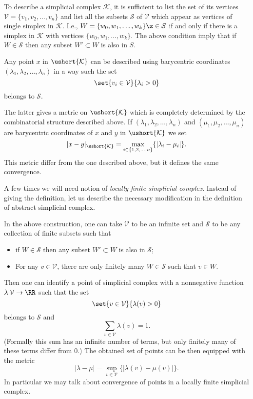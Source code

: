 To describe a simplicial complex $\mathcal{K}$, it is sufficient to list the set of its vertices 
$\mathcal{V}=\{v_1,v_2,\dots,v_n\}$ and list all the subsets $\mathcal{S}$ of $\mathcal{V}$ which appear as vertices of single simplex in $\mathcal{K}$.
I.e., $W=\{w_0,w_1,\dots,w_k\}\z\in \mathcal{S}$ if and only if 
there is a simplex in $\mathcal{K}$ with vertices $\{w_0,w_1,\dots,w_k\}$.
The above condition imply that if $W\in \mathcal{S}$ then any subset $W'\subset W$ is also in $S$.

Any point $x$ in $\ushort{\mathcal{K}}$ can be described using barycentric coordinates 
$(\lambda_1,\lambda_2,\dots,\lambda_n)$ in a way such the set 
$$\set{v_i\in\mathcal{V}}{\lambda_i>0}$$
belongs to $\mathcal{S}$.

The latter gives a metric on $\ushort{\mathcal{K}}$ which is completely determined by the combinatorial structure described above.
If $(\lambda_1,\lambda_2,\dots,\lambda_n)$ and $(\mu_1,\mu_2,\dots,\mu_n)$
are barycentric coordinates of $x$ and $y$ in $\ushort{\mathcal{K}}$ we set
$$|x-y|_{\ushort{\mathcal{K}}}=\max_{i\in\{1,2,\dots,n\}}\{|\lambda_i-\mu_i|\}.$$
This metric differ from the one described above, but it defines the same convergence.



A few times we will need notion of \emph{locally finite simplicial complex}.
Instead of giving the definition, let us describe the necessary modification in the definition of abstract simplicial complex.

In the above construction, one can take $\mathcal{V}$ to be an infinite set and 
$\mathcal{S}$ to be any collection of finite subsets such that
\begin{itemize}
\item if $W\in \mathcal{S}$ then any subset $W'\subset W$ is also in $\mathcal{S}$;
\item For any $v\in \mathcal{V}$, there are only finitely many $W \in \mathcal{S}$ such that $v \in W$.
\end{itemize}
Then one can identify a point of simplicial complex with a nonnegative function
$\lambda\:\mathcal{V}\to\RR$ such that the set
$$\set{v\in\mathcal{V}}{\lambda(v)>0}$$
belongs to $\mathcal{S}$
and 
$$\sum_{v\in \mathcal{V}}\lambda(v)=1.$$
(Formally this sum has an infinite number of terms,
but only finitely many of these terms differ from $0$.)
The obtained set of points can be then equipped with the metric 
$$|\lambda-\mu|=\sup_{v\in\mathcal{V}}\{|\lambda(v)-\mu(v)|\}.$$
In particular we may talk about convergence of points in a locally finite simplicial complex.

